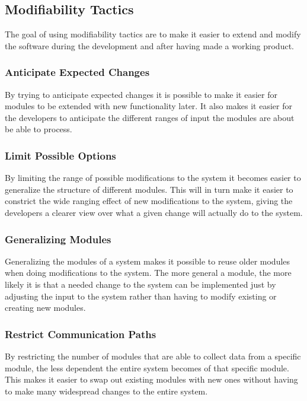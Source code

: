 \subsection{Modifiability Tactics}
The goal of using modifiability tactics are to make it easier to extend and modify the software during the development and after having made a working product.

\subsubsection{Anticipate Expected Changes}
By trying to anticipate expected changes it is possible to make it easier for modules to be extended with new functionality later. It also makes it easier for the developers to anticipate the different ranges of input the modules are about be able to process.

\subsubsection{Limit Possible Options}
By limiting the range of possible modifications to the system it becomes easier to generalize the structure of different modules. This will in turn make it easier to constrict the wide ranging effect of new modifications to the system, giving the developers a clearer view over what a given change will actually do to the system.

\subsubsection{Generalizing Modules}
Generalizing the modules of a system makes it possible to reuse older modules when doing modifications to the system. The more general a module, the more likely it is that a needed change to the system can be implemented just by adjusting the input to the system rather than having to modify existing or creating new modules.

\subsubsection{Restrict Communication Paths}
By restricting the number of modules that are able to collect data from a specific module, the less dependent the entire system becomes of that specific module. This makes it easier to swap out existing modules with new ones without having to make many widespread changes to the entire system.

